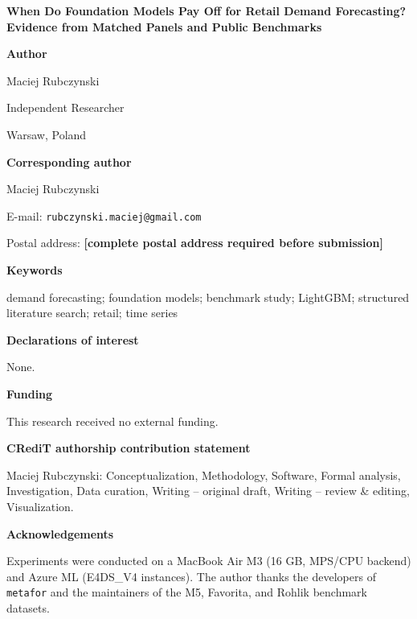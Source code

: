 \documentclass[12pt]{article}
\providecommand{\CorrespondingPostalAddress}{\textbf{[complete postal address required before submission]}}
\begin{document}
\begin{center}
{\Large\bfseries When Do Foundation Models Pay Off for Retail Demand Forecasting?\\[4pt]
Evidence from Matched Panels and Public Benchmarks}
\end{center}

\bigskip
\noindent\textbf{Author}\par
Maciej Rubczynski\par
Independent Researcher\par
Warsaw, Poland

\medskip
\noindent\textbf{Corresponding author}\par
Maciej Rubczynski\par
E-mail: \texttt{rubczynski.maciej@gmail.com}\par
Postal address: \CorrespondingPostalAddress

\medskip
\noindent\textbf{Keywords}\par
demand forecasting; foundation models; benchmark study; LightGBM; structured
literature search; retail; time series

\medskip
\noindent\textbf{Declarations of interest}\par
None.

\medskip
\noindent\textbf{Funding}\par
This research received no external funding.

\medskip
\noindent\textbf{CRediT authorship contribution statement}\par
Maciej Rubczynski: Conceptualization, Methodology, Software, Formal analysis,
Investigation, Data curation, Writing -- original draft, Writing -- review \&
editing, Visualization.

\medskip
\noindent\textbf{Acknowledgements}\par
Experiments were conducted on a MacBook Air M3 (16 GB, MPS/CPU backend) and
Azure ML (E4DS\_V4 instances). The author thanks the developers of
\texttt{metafor} and the maintainers of the M5, Favorita, and Rohlik benchmark
datasets.
\end{document}

